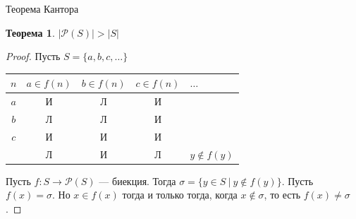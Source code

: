 \documentclass[aspectratio=169]{beamer}
\newtheorem{thm}{Теорема}[section]
\begin{document}
\begin{frame}{Теорема Кантора}
\begin{thm}$|\mathcal{P}(S)| > |S|$\end{thm}
\begin{proof}Пусть $S = \{a,b,c,\dots\}$

\begin{center}\begin{tabular}{c|cccl}
$n$ & $a \in f(n)$ & $b \in f(n)$ & $c \in f(n)$ & $\dots$ \\\hline
$a$ & \color{red}И & Л & И \\
$b$ &       Л & \color{red}Л& И \\
$c$ &   И & И & \color{red}И\\\hline
   & Л & И & Л & $y \notin f(y)$
\end{tabular}\end{center}\pause

Пусть $f: S \rightarrow \mathcal{P}(S)$ --- биекция. Тогда 
$\sigma = \{ y\in S\ |\ y\notin f(y)\}$. Пусть $f(x) = \sigma$.
Но $x \in f(x)$ тогда и только тогда, когда $x \notin \sigma$, то есть $f(x) \ne \sigma$.
\end{proof}
\end{frame}
\end{document}
